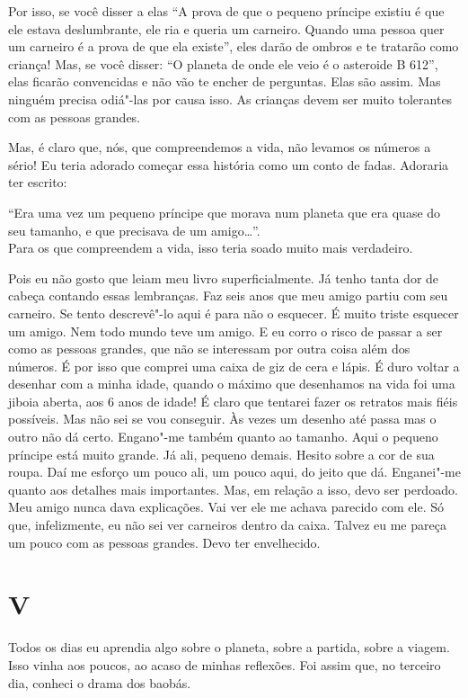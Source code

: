 \begin{Parallel}[p]{}{}
{Por isso, se você disser a elas ``A prova de que o pequeno príncipe
existiu é que ele estava deslumbrante, ele ria e queria um carneiro.
Quando uma pessoa quer um carneiro é a prova de que ela existe'', eles
darão de ombros e te tratarão como criança! Mas, se você disser: ``O
planeta de onde ele veio é o asteroide B 612'', elas ficarão convencidas
e não vão te encher de perguntas. Elas são assim. Mas ninguém precisa
odiá"-las por causa isso. As crianças devem ser muito tolerantes com as
pessoas grandes.

Mas, é claro que, nós, que compreendemos a vida, não levamos os números
a sério! Eu teria adorado começar essa história como um conto de fadas.
Adoraria ter escrito:

``Era uma vez um pequeno príncipe que morava num planeta que era quase
do seu tamanho, e que precisava de um amigo\ldots{}''.\\ Para os que compreendem
a vida, isso teria soado muito mais verdadeiro.

Pois eu não gosto que leiam meu livro superficialmente. Já tenho tanta
dor de cabeça contando essas lembranças. Faz seis anos que meu amigo
partiu com seu carneiro. Se tento descrevê"-lo aqui é para não o
esquecer. É muito triste esquecer um amigo. Nem todo mundo teve um
amigo. E eu corro o risco de passar a ser como as pessoas grandes, que
não se interessam por outra coisa além dos números. É por isso que
comprei uma caixa de giz de cera e lápis. É duro voltar a desenhar com a
minha idade, quando o máximo que desenhamos na vida foi uma jiboia
aberta, aos 6 anos de idade! É claro que tentarei fazer os retratos mais
fiéis possíveis. Mas não sei se vou conseguir. Às vezes um desenho até
passa mas o outro não dá certo. Engano"-me também quanto ao tamanho. Aqui
o pequeno príncipe está muito grande. Já ali, pequeno demais. Hesito
sobre a cor de sua roupa. Daí me esforço um pouco ali, um pouco aqui, do
jeito que dá. Enganei"-me quanto aos detalhes mais importantes. Mas, em
relação a isso, devo ser perdoado. Meu amigo nunca dava explicações. Vai
ver ele me achava parecido com ele. Só que, infelizmente, eu não sei ver
carneiros dentro da caixa. Talvez eu me pareça um pouco com as pessoas
grandes. Devo ter envelhecido.\\

\section{V}

Todos os dias eu aprendia algo sobre o planeta, sobre a partida, sobre a
viagem. Isso vinha aos poucos, ao acaso de minhas reflexões. Foi assim
que, no terceiro dia, conheci o drama dos baobás.

}
\end{Parallel}
